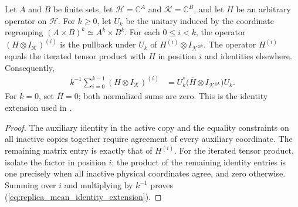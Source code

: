 \begin{theorem}
    \label{thm:replica_mean_identity_extension}
    \leanok
    Let $A$ and $B$ be finite sets, let $\mathcal H=\mathbb C^A$ and
    $\mathcal K=\mathbb C^B$, and let $H$ be
    an arbitrary operator on $\mathcal H$. For $k\ge0$, let $U_k$ be the
    unitary induced by the coordinate regrouping
    $(A\times B)^k\simeq A^k\times B^k$.
    For each $0\le i<k$, the operator $(H\otimes I_{\mathcal K})^{(i)}$
    is the pullback under $U_k$ of $H^{(i)}\otimes I_{\mathcal K^{\otimes k}}$.
    The operator $H^{(i)}$ equals the iterated tensor product with $H$ in
    position $i$ and identities elsewhere. Consequently,
    \begin{align}
        k^{-1}\sum_{i=0}^{k-1}(H\otimes I_{\mathcal K})^{(i)}
         & =U_k^*\bigl(\overline H\otimes I_{\mathcal K^{\otimes k}}\bigr)U_k.
        \label{eq:replica_mean_identity_extension}
    \end{align}
    For $k=0$, set $\overline H=0$; both normalized sums are zero.
    This is the identity extension used in
    \cite[Sections~6 and~7]{OpenAI2026AreaLaw}.
\end{theorem}
\begin{proof}
    \leanok
    The auxiliary identity in the active copy and the equality constraints on
    all inactive copies together require agreement of every auxiliary
    coordinate. The remaining matrix entry is exactly that of $H^{(i)}$.
    For the iterated tensor product, isolate the factor in position $i$;
    the product of the remaining identity entries is one precisely when all
    inactive physical coordinates agree, and zero otherwise.
    Summing over $i$ and multiplying by $k^{-1}$ proves
    (\ref{eq:replica_mean_identity_extension}).
\end{proof}
